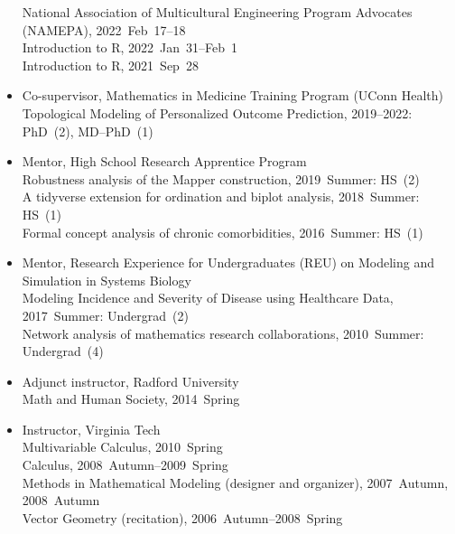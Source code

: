 \documentclass[10pt,a4paper]{article}
\begin{document}
\begin{itemize}[label=$\circ$,nolistsep]
National Association of Multicultural Engineering Program Advocates (NAMEPA), 2022~Feb~17--18 \\
Introduction to R, 2022~Jan~31--Feb~1 \\
Introduction to R, 2021~Sep~28
\item
Co-supervisor, Mathematics in Medicine Training Program (UConn Health) \\
Topological Modeling of Personalized Outcome Prediction, 2019--2022: PhD~(2), MD--PhD~(1)
\item
Mentor, High School Research Apprentice Program \\
Robustness analysis of the Mapper construction, 2019~Summer: HS~(2) \\
A tidyverse extension for ordination and biplot analysis, 2018~Summer: HS~(1) \\
Formal concept analysis of chronic comorbidities, 2016~Summer: HS~(1)
\item
Mentor, Research Experience for Undergraduates (REU) on Modeling and Simulation in Systems Biology \\
Modeling Incidence and Severity of Disease using Healthcare Data, 2017~Summer: Undergrad~(2) \\
Network analysis of mathematics research collaborations, 2010~Summer: Undergrad~(4)
\item
Adjunct instructor, Radford University \\
Math and Human Society, 2014~Spring
\item
Instructor, Virginia Tech \\
Multivariable Calculus, 2010~Spring \\
Calculus, 2008~Autumn--2009~Spring \\
Methods in Mathematical Modeling (designer and organizer), 2007~Autumn, 2008~Autumn \\
Vector Geometry (recitation), 2006~Autumn--2008~Spring

\end{itemize}
\end{document}
